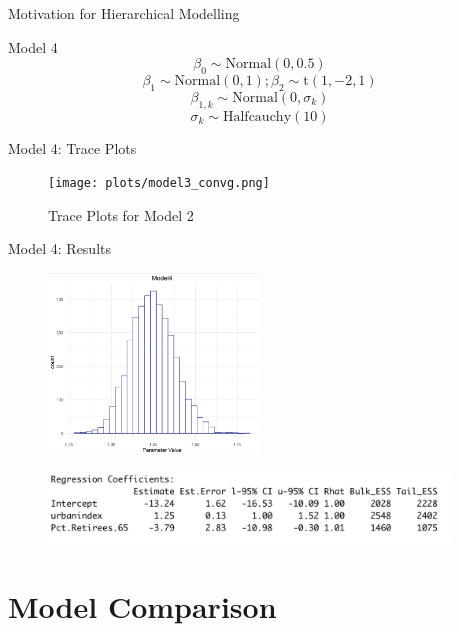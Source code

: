 \documentclass{beamer}
\begin{document}
\begin{frame}{Motivation for Hierarchical Modelling}
\begin{frame}{Model 4}
    \[\beta_0 \sim \text{Normal}(0, 0.5)\]
    \[\beta_1 \sim \text{Normal}(0, 1); \beta_2 \sim \text{t}(1,-2,1)\]
    \[\beta_{1,k} \sim \text{Normal}(0, \sigma_k)\]
    \[ \sigma_k \sim \text{Halfcauchy}(10)\]
    
\end{frame}

\begin{frame}{Model 4: Trace Plots}
    \begin{center}
        \begin{figure}
            \texttt{[image: plots/model3\_convg.png]}
            \caption{Trace Plots for Model 2}
        \end{figure}
    \end{center}
\end{frame}


\begin{frame}{Model 4: Results}
    \begin{figure}
        \includegraphics[width=0.5\textwidth]{plots/model4_postui.png}
    \end{figure}
    \begin{figure}
        \includegraphics[width=0.95\textwidth]{plots/model4_coeff.png}
    \end{figure}
\end{frame}






\section{Model Comparison}


\end{frame}
\end{document}
